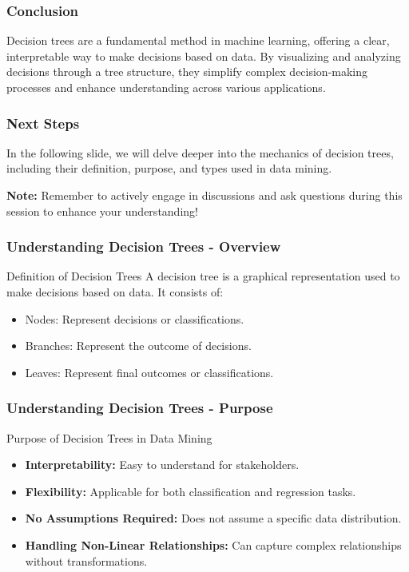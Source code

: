 \documentclass[aspectratio=169]{beamer}
\begin{document}
\begin{frame}[fragile]
    \frametitle{Conclusion}
    
    Decision trees are a fundamental method in machine learning, offering a clear, interpretable way to make decisions based on data. By visualizing and analyzing decisions through a tree structure, they simplify complex decision-making processes and enhance understanding across various applications.
\end{frame}

\begin{frame}[fragile]
    \frametitle{Next Steps}
    
    In the following slide, we will delve deeper into the mechanics of decision trees, including their definition, purpose, and types used in data mining.
    
    \textbf{Note:} Remember to actively engage in discussions and ask questions during this session to enhance your understanding!
\end{frame}

\begin{frame}[fragile]
    \frametitle{Understanding Decision Trees - Overview}
    \begin{block}{Definition of Decision Trees}
        A decision tree is a graphical representation used to make decisions based on data. It consists of:
        \begin{itemize}
            \item Nodes: Represent decisions or classifications.
            \item Branches: Represent the outcome of decisions.
            \item Leaves: Represent final outcomes or classifications.
        \end{itemize}
    \end{block}
\end{frame}

\begin{frame}[fragile]
    \frametitle{Understanding Decision Trees - Purpose}
    \begin{block}{Purpose of Decision Trees in Data Mining}
        \begin{itemize}
            \item \textbf{Interpretability:} Easy to understand for stakeholders.
            \item \textbf{Flexibility:} Applicable for both classification and regression tasks.
            \item \textbf{No Assumptions Required:} Does not assume a specific data distribution.
            \item \textbf{Handling Non-Linear Relationships:} Can capture complex relationships without transformations.
        \end{itemize}
    \end{block}
\end{frame}
\end{document}

